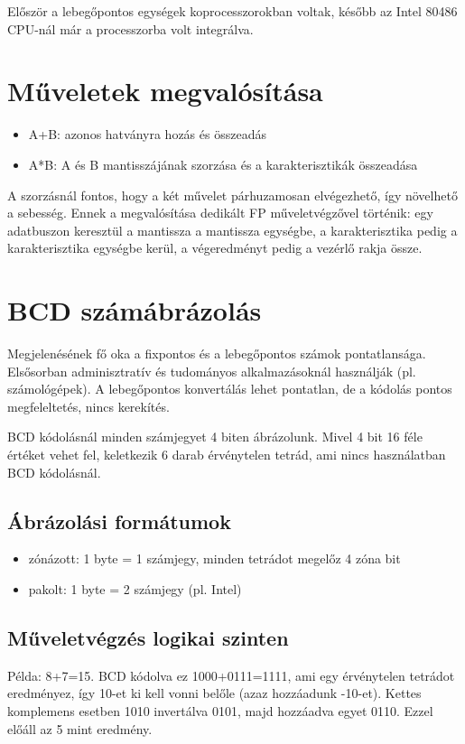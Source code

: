 Először a lebegőpontos egységek koprocesszorokban voltak, később az Intel 80486 CPU-nál már a processzorba volt integrálva.

\section{Műveletek megvalósítása}

\begin{itemize}
    \item A+B: azonos hatványra hozás és összeadás
    \item A*B: A és B mantisszájának szorzása és a karakterisztikák összeadása
\end{itemize}
A szorzásnál fontos, hogy a két művelet párhuzamosan elvégezhető, így növelhető a sebesség.
Ennek a megvalósítása dedikált FP műveletvégzővel történik: egy adatbuszon keresztül a mantissza a mantissza egységbe, a karakterisztika pedig a karakterisztika egységbe kerül, a végeredményt pedig a vezérlő rakja össze.

\section{BCD számábrázolás}
Megjelenésének fő oka a fixpontos és a lebegőpontos számok pontatlansága.
Elsősorban adminisztratív és tudományos alkalmazásoknál használják (pl. számológépek).
A lebegőpontos konvertálás lehet pontatlan, de a kódolás pontos megfeleltetés, nincs kerekítés.

BCD kódolásnál minden számjegyet 4 biten ábrázolunk.
Mivel 4 bit 16 féle értéket vehet fel, keletkezik 6 darab érvénytelen tetrád, ami nincs használatban BCD kódolásnál.

\subsection{Ábrázolási formátumok}
\begin{itemize}
    \item zónázott: 1 byte = 1 számjegy, minden tetrádot megelőz 4 zóna bit
    \item pakolt: 1 byte = 2 számjegy (pl. Intel)
\end{itemize}

\subsection{Műveletvégzés logikai szinten}
Példa: 8+7=15.
BCD kódolva ez 1000+0111=1111, ami egy érvénytelen tetrádot eredményez, így 10-et ki kell vonni belőle (azaz hozzáadunk -10-et).
Kettes komplemens esetben 1010 invertálva 0101, majd hozzáadva egyet 0110.
Ezzel előáll az 5 mint eredmény.

